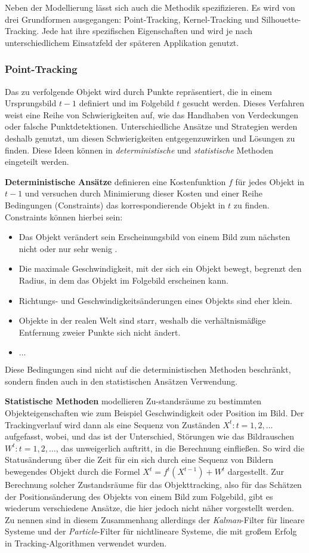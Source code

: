 Neben der Modellierung lässt sich auch die Methodik spezifizieren. Es wird von drei Grundformen ausgegangen: Point-Tracking, Kernel-Tracking und Silhouette-Tracking. Jede hat ihre spezifischen Eigenschaften und wird je nach unterschiedlichem Einsatzfeld der späteren Applikation genutzt.

\subsubsection{Point-Tracking}
Das zu verfolgende Objekt wird durch Punkte repräsentiert, die in einem Ursprungsbild $t-1$ definiert und im Folgebild $t$ gesucht werden. Dieses Verfahren weist eine Reihe von Schwierigkeiten auf, wie das Handhaben von Verdeckungen oder falsche Punktdetektionen. Unterschiedliche Ansätze und Strategien werden deshalb genutzt, um diesen Schwierigkeiten entgegenzuwirken und Lösungen zu finden. Diese Ideen können in \textit{deterministische} und \textit{statistische} Methoden eingeteilt werden.

{\bf Deterministische Ansätze} definieren eine Kostenfunktion $f$ für jedes Objekt in $t-1$ und versuchen durch Minimierung dieser Kosten und einer Reihe Bedingungen (Constraints) das korrespondierende Objekt in $t$ zu finden. Constraints können hierbei sein:

\begin{itemize}
\item Das Objekt verändert sein Erscheinungsbild von einem Bild zum nächsten nicht oder nur sehr wenig \cite{FPIS}.
\item Die maximale Geschwindigkeit, mit der sich ein Objekt bewegt, begrenzt den Radius, in dem das Objekt im Folgebild erscheinen kann.
\item Richtungs- und Geschwindigkeitsänderungen eines Objekts sind eher klein.
\item Objekte in der realen Welt sind starr, weshalb die verhältnismäßige Entfernung zweier Punkte sich nicht ändert.
\item $\dots$
\end{itemize}
Diese Bedingungen sind nicht auf die deterministischen Methoden beschränkt, sondern finden auch in den statistischen Ansätzen Verwendung.

{\bf Statistische Methoden} modellieren Zu-standsräume zu bestimmten Objekteigenschaften wie zum Beispiel Geschwindigkeit oder Position im Bild. Der Trackingverlauf wird dann als eine Sequenz von Zuständen $X^{t}:t=1,2,\dots$ aufgefasst, wobei, und das ist der Unterschied, Störungen wie das Bildrauschen $W^{t}:t=1,2,\dots$, das unweigerlich auftritt, in die Berechnung einfließen. So wird die Statusänderung über die Zeit für ein sich durch eine Sequenz von Bildern bewegendes Objekt durch die Formel $X^{t}=f^{t}(X^{t-1})+W^{t}$ dargestellt. Zur Berechnung solcher Zustandsräume für das Objekttracking, also für das Schätzen der Positionsänderung des Objekts von einem Bild zum Folgebild, gibt es wiederum verschiedene Ansätze, die hier jedoch nicht näher vorgestellt werden. Zu nennen sind in diesem Zusammenhang allerdings der \textit{Kalman}-Filter\cite{KAF} für lineare Systeme und der \textit{Particle}-Filter \cite{PAF} für nichtlineare Systeme, die mit großem Erfolg in Tracking-Algorithmen verwendet wurden.

